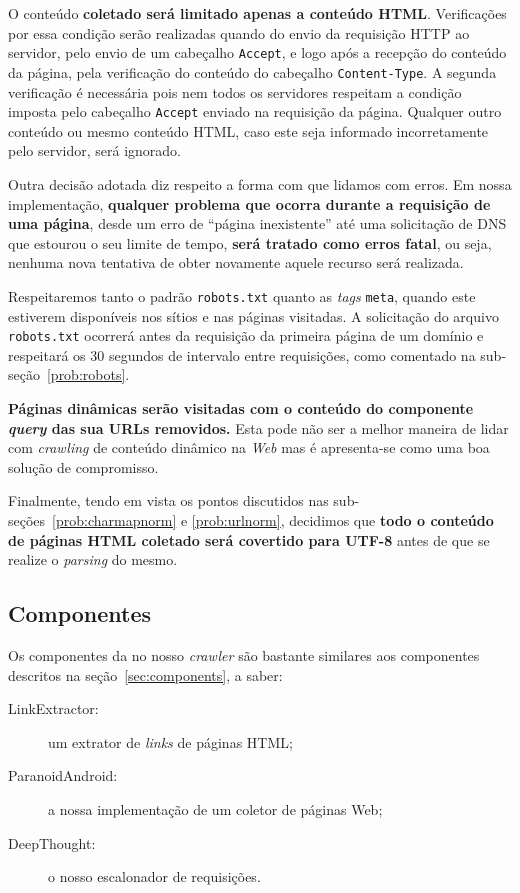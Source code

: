 \documentclass[10pt,twocolumn]{article}
\begin{document}
O conteúdo \textbf{coletado será limitado apenas a conteúdo HTML}.
Verificações por essa condição serão realizadas quando do envio da
requisição HTTP ao
servidor, pelo envio de um cabeçalho \texttt{Accept}, e logo após a
recepção do conteúdo da página, pela verificação do conteúdo do
cabeçalho \texttt{Content-Type}. A segunda
verificação é necessária pois nem todos os servidores respeitam a
condição imposta pelo cabeçalho \texttt{Accept} enviado na requisição da
página. Qualquer outro
conteúdo ou mesmo conteúdo HTML, caso este seja informado incorretamente pelo
servidor, será ignorado.

Outra decisão adotada diz respeito a forma com que lidamos com erros. Em
nossa implementação, \textbf{qualquer problema que ocorra durante a requisição
de uma página}, desde um erro de ``página inexistente'' até uma
solicitação de DNS que estourou o seu limite de tempo, \textbf{será tratado
como erros fatal}, ou seja, nenhuma nova tentativa de obter novamente
aquele recurso será realizada.

Respeitaremos tanto o padrão \texttt{robots.txt} quanto as
\emph{tags} \texttt{meta}, quando este estiverem disponíveis nos sítios
e nas páginas visitadas. A solicitação do arquivo \texttt{robots.txt}
ocorrerá antes da requisição da primeira página de um domínio e
respeitará os 30 segundos de intervalo entre requisições, como comentado
na sub-seção~\ref{prob:robots}.

\textbf{Páginas dinâmicas serão visitadas com o conteúdo do componente
\emph{query} das sua URLs removidos.} Esta pode não ser a melhor maneira
de lidar com \emph{crawling} de conteúdo dinâmico na \emph{Web} mas é
apresenta-se como uma boa solução de compromisso.

Finalmente, tendo em vista os pontos discutidos nas
sub-seções~\ref{prob:charmapnorm} e \ref{prob:urlnorm}, decidimos que
\textbf{todo o conteúdo de páginas HTML coletado será covertido para
UTF-8} antes
de que se realize o \emph{parsing} do mesmo.


\subsection{Componentes}

Os componentes da no nosso \emph{crawler} são bastante similares aos
componentes descritos na seção~\ref{sec:components}, a saber:
\begin{description}
\item[LinkExtractor:] um extrator de \emph{links} de páginas HTML;
\item[ParanoidAndroid:] a nossa implementação de um coletor de páginas
Web;
\item[DeepThought:] o nosso escalonador de requisições.
\end{description}
\end{document}
